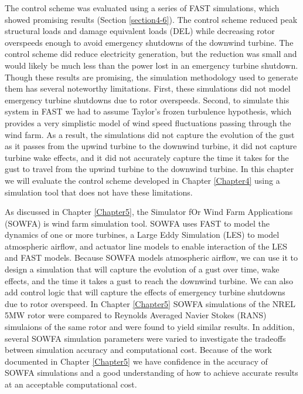 The control scheme was evaluated using a series of FAST simulations, which showed promising results (Section \ref{section4-6}). The control scheme reduced peak structural loads and damage equivalent loads (DEL) while decreasing rotor overspeeds enough to avoid emergency shutdowns of the downwind turbine. The control scheme did reduce electricity generation, but the reduction was small and would likely be much less than the power lost in an emergency turbine shutdown. Though these results are promising, the simulation methodology used to generate them has several noteworthy limitations. First, these simulations did not model emergency turbine shutdowns due to rotor overspeeds. Second, to simulate this system in FAST we had to assume Taylor's frozen turbulence hypothesis, which provides a very simplistic model of wind speed fluctuations passing through the wind farm. As a result, the simulations did not capture the evolution of the gust as it passes from the upwind turbine to the downwind turbine, it did not capture turbine wake effects, and it did not accurately capture the time it takes for the gust to travel from the upwind turbine to the downwind turbine. In this chapter we will evaluate the control scheme developed in Chapter \ref{Chapter4} using a simulation tool that does not have these limitations.

As discussed in Chapter \ref{Chapter5}, the Simulator fOr Wind Farm Applications (SOWFA) is  wind farm simulation tool. SOWFA uses FAST to model the dynamics of one or more turbines, a Large Eddy Simulation (LES) to model atmospheric airflow, and actuator line models to enable interaction of the LES and FAST models. Because SOWFA models atmospheric airflow, we can use it to design a simulation that will capture the evolution of a gust over time, wake effects, and the time it takes a gust to reach the downwind turbine. We can also add control logic that will capture the effects of emergency turbine shutdowns due to rotor overspeed. In Chapter \ref{Chapter5} SOWFA simulations of the NREL 5MW rotor were compared to Reynolds Averaged Navier Stokes (RANS) simulaions of the same rotor and were found to yield similar results. In addition, several SOWFA simulation parameters were varied to investigate the tradeoffs between simulation accuracy and computational cost. Because of the work documented in Chapter \ref{Chapter5} we have confidence in the accuracy of SOWFA simulations and a good understanding of how to achieve accurate results at an acceptable computational cost.

